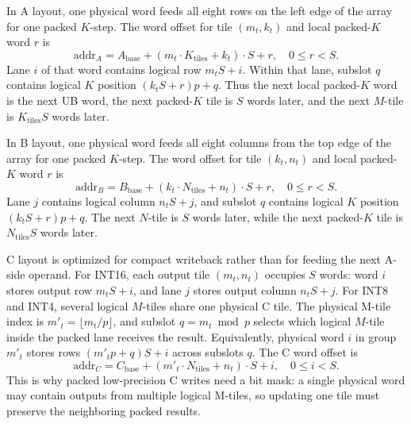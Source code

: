 \documentclass[a4paper, 12pt, titlepage]{article}
\begin{document}
In A layout, one physical word feeds all eight rows on the left edge of the array for one packed \(K\)-step. The word offset for tile \((m_t,k_t)\) and local packed-\(K\) word \(r\) is
\[
    \mathrm{addr}_A = A_{\mathrm{base}} + (m_t \cdot K_{\mathrm{tiles}} + k_t) \cdot S + r,
    \quad 0 \le r < S.
\]
Lane \(i\) of that word contains logical row \(m_t S+i\). Within that lane, subslot \(q\) contains logical \(K\) position \((k_t S+r)p+q\). Thus the next local packed-\(K\) word is the next UB word, the next packed-\(K\) tile is \(S\) words later, and the next \(M\)-tile is \(K_{\mathrm{tiles}}S\) words later.

In B layout, one physical word feeds all eight columns from the top edge of the array for one packed \(K\)-step. The word offset for tile \((k_t,n_t)\) and local packed-\(K\) word \(r\) is
\[
    \mathrm{addr}_B = B_{\mathrm{base}} + (k_t \cdot N_{\mathrm{tiles}} + n_t) \cdot S + r,
    \quad 0 \le r < S.
\]
Lane \(j\) contains logical column \(n_t S+j\), and subslot \(q\) contains logical \(K\) position \((k_t S+r)p+q\). The next \(N\)-tile is \(S\) words later, while the next packed-\(K\) tile is \(N_{\mathrm{tiles}}S\) words later.

C layout is optimized for compact writeback rather than for feeding the next A-side operand. For INT16, each output tile \((m_t,n_t)\) occupies \(S\) words: word \(i\) stores output row \(m_tS+i\), and lane \(j\) stores output column \(n_tS+j\). For INT8 and INT4, several logical \(M\)-tiles share one physical C tile. The physical M-tile index is \(m'_t=\lfloor m_t/p \rfloor\), and subslot \(q=m_t \bmod p\) selects which logical \(M\)-tile inside the packed lane receives the result. Equivalently, physical word \(i\) in group \(m'_t\) stores rows \((m'_t p+q)S+i\) across subslots \(q\). The C word offset is
\[
    \mathrm{addr}_C = C_{\mathrm{base}} + (m'_t \cdot N_{\mathrm{tiles}} + n_t) \cdot S + i,
    \quad 0 \le i < S.
\]
This is why packed low-precision C writes need a bit mask: a single physical word may contain outputs from multiple logical M-tiles, so updating one tile must preserve the neighboring packed results.
\end{document}

